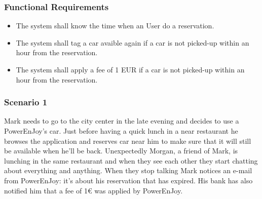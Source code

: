 \subsubsection{Functional Requirements}
\begin{itemize}
  \item The system shall know the time when an User do a reservation.
  \item The system shall tag a car avaible again if a car is not picked-up within an hour from the reservation.
  \item The system shall apply a fee of 1 EUR if a car is not picked-up within an hour from the reservation.
\end{itemize}

\subsubsection{Scenario 1}
Mark needs to go to the city center in the late evening and decides to use a PowerEnJoy's car. Just before having a quick lunch in a near restaurant he browses the application and reserves car near him to make sure that it will still be available when he'll be back.
Unexpectedly Morgan, a friend of Mark, is lunching in the same restaurant and when they see each other they start chatting about everything and anything. When they stop talking Mark notices an e-mail from PowerEnJoy: it's about his reservation that has expired. His bank has also notified him that a fee of 1€ was applied by PowerEnJoy.



